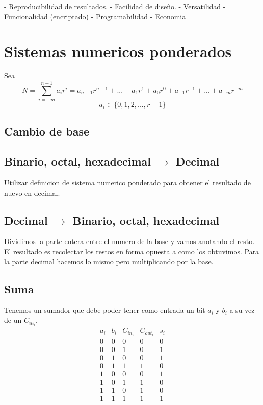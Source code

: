 \documentclass{report}
\begin{document}
- Reproducibilidad de resultados.
- Facilidad de diseño.
- Versatilidad
- Funcionalidad (encriptado)
- Programabilidad
- Economia

\chapter{Sistemas numericos ponderados}

Sea $$N = \sum_{i=-m}^{n-1} a_i r^i= a_{n-1}r^{n-1}+...+a_1r^1+a_0r^0+a_{-1}r^{-1}+...+a_{-m}r^{-m}$$
$$a_i \in \{0,1,2,...,r-1\}$$

\section{Cambio de base}

\section{Binario, octal, hexadecimal $\to$ Decimal}

Utilizar definicion de sistema numerico ponderado para obtener el resultado de nuevo en decimal.

\section{Decimal $\to$ Binario, octal, hexadecimal}

Dividimos la parte entera entre el numero de la base y vamos anotando el resto.
El resultado es recolectar los restos en forma opuesta a como los obtuvimos.
Para la parte decimal hacemos lo mismo pero multiplicando por la base.

\section{Suma}

Tenemos un sumador que debe poder tener como entrada un bit $a_i$ y $b_i$ a su vez de un $C_{in_i}$.
$$\begin{array}{ccc|cc}
		a_i & b_i & C_{in_i} & C_{out_i} & s_i \\ \hline
		0   & 0   & 0        & 0         & 0   \\
		0   & 0   & 1        & 0         & 1   \\
		0   & 1   & 0        & 0         & 1   \\
		0   & 1   & 1        & 1         & 0   \\
		1   & 0   & 0        & 0         & 1   \\
		1   & 0   & 1        & 1         & 0   \\
		1   & 1   & 0        & 1         & 0   \\
		1   & 1   & 1        & 1         & 1   \\
	\end{array}$$
\end{document}

